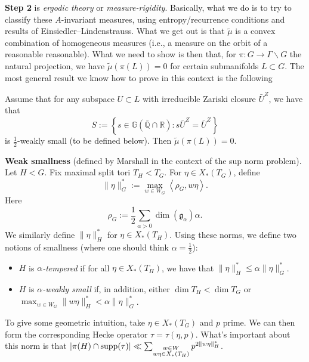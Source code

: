 \documentclass[reqno]{amsart} 
\begin{document}
\textbf{Step 2} is \emph{ergodic theory} or \emph{measure-rigidity}.  Basically, what we do is to try to classify these $A$-invariant measures, using entropy/recurrence conditions and results of Einsiedler--Lindenstrauss.  What we get out is that $\tilde{\mu}$ is a convex combination of homogeneous measures (i.e., a measure on the orbit of a reasonable reasonable).  What we need to show is then that, for $\pi : G \rightarrow \Gamma \backslash G$ the natural projection, we have $\tilde{\mu}(\pi(L)) = 0$ for certain submanifolds $L \subset G$.  The most general result we know how to prove in this context is the following
\begin{theorem}
  Assume that for any subspace $U \subset L$ with irreducible Zariski closure $\bar{U}^Z$, we have that
  \begin{equation*}
    S := \left\{ s \in \mathbb{G}(\bar{\mathbb{Q}} \cap \mathbb{R})
      :
      s \bar{U}^Z = \bar{U}^Z
    \right\}
  \end{equation*}
  is $\tfrac{1}{2}$-weakly small (to be defined below).  Then $\tilde{\mu}(\pi(L)) = 0$.
\end{theorem}
\textbf{Weak smallness} (defined by Marshall in the context of the sup norm problem).  Let $H < G$.  Fix maximal split tori $T_H < T_G$.  For $\eta \in X_\ast(T_G)$, define
\begin{equation*}
  \lVert \eta \rVert_G^\ast := \max_{w \in W_G}
  \left\langle \rho_G, w \eta \right\rangle.
\end{equation*}
Here
\begin{equation*}
  \rho_G := \frac{1}{2} \sum_{\alpha > 0} \dim(\mathfrak{g}_\alpha) \alpha.
\end{equation*}
We similarly define $\lVert \eta \rVert_H^\ast$ for $\eta \in X_\ast(T_H)$.  Using these norms, we define two notions of smallness (where one should think $\alpha = \tfrac{1}{2}$):
\begin{itemize}
\item $H$ is $\alpha$\emph{-tempered} if for all $\eta \in X_\ast(T_H)$, we have that $\lVert \eta \rVert_H^\ast \leq \alpha \lVert \eta \rVert_G^\ast$.
\item $H$ is $\alpha$\emph{-weakly small} if, in addition, either $\dim T_H < \dim T_G$ or $\max_{w \in W_G} \lVert w \eta \rVert_H^\ast < \alpha \lVert \eta \rVert_G^\ast$.
\end{itemize}
To give some geometric intuition, take $\eta \in X_\ast(T_G)$ and $p$ prime.  We can then form the corresponding Hecke operator $\tau = \tau(\eta, p)$.  What's important about this norm is that $\lvert \pi(H) \cap \operatorname{supp}(\tau) \rvert \ll \sum_{ \substack{
    w \in W  \\
    w \eta \in X_\ast(T_H)    
  } } p^{2 \lVert w \eta \rVert_H^\ast}$.
\end{document}
